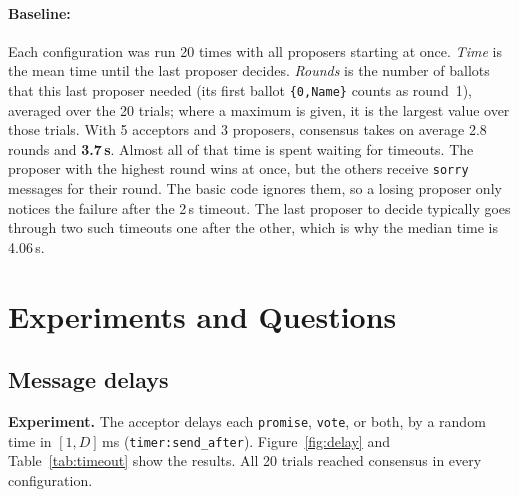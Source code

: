 \documentclass[a4paper, 10pt]{article}
\begin{document}
\paragraph{Baseline:} Each configuration was run 20 times with all proposers starting at once. \emph{Time} is the mean time until the last proposer decides. \emph{Rounds} is the number of ballots that this last proposer needed (its first ballot \texttt{\{0,Name\}} counts as round~1), averaged over the 20 trials; where a maximum is given, it is the largest value over those trials. With 5 acceptors and 3 proposers, consensus takes on average 2.8 rounds and \textbf{3.7\,s}. Almost all of that time is spent waiting for timeouts. The proposer with the highest round wins at once, but the others receive \texttt{sorry} messages for their round. The basic code ignores them, so a losing proposer only notices the failure after the 2\,s timeout. The last proposer to decide typically goes through two such timeouts one after the other, which is why the median time is 4.06\,s.

\section{Experiments and Questions}

\subsection{Message delays}

\textbf{Experiment.} The acceptor delays each \texttt{promise}, \texttt{vote}, or both, by a random time in $[1, D]$\,ms (\texttt{timer:send\_after}). Figure~\ref{fig:delay} and Table~\ref{tab:timeout} show the results. All 20 trials reached consensus in every configuration.
\end{document}
